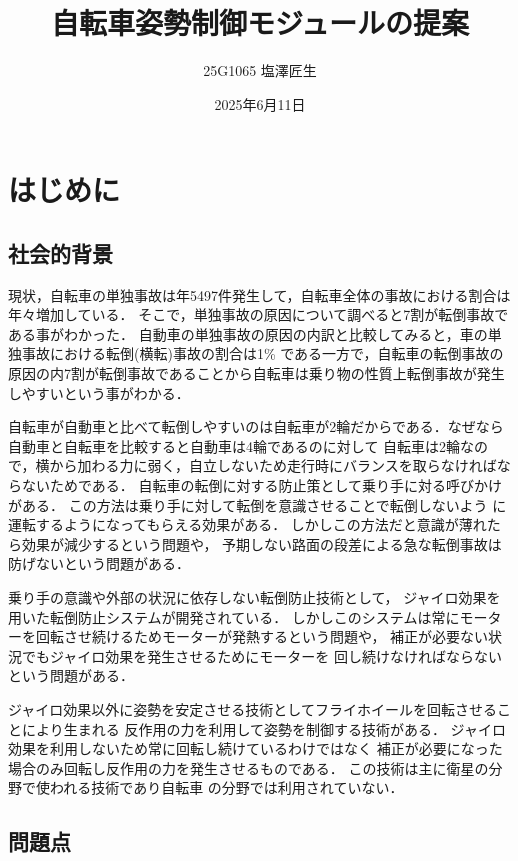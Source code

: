 \documentclass[uplatex,dvipdfmx]{jsarticle}
\begin{document}
\title{自転車姿勢制御モジュールの提案}
\author{25G1065 塩澤匠生}
\date{2025年6月11日}
\maketitle
\section{はじめに}

\subsection{社会的背景}

現状，自転車の単独事故は年5497件発生して，自転車全体の事故における割合は年々増加している\cite{jikokensuu}．
そこで，単独事故の原因について調べると7割が転倒事故である事がわかった\cite{tandokuWariai}．
自動車の単独事故の原因の内訳と比較してみると，車の単独事故における転倒(横転)事故の割合は1\%
である一方で，自転車の転倒事故の原因の内7割が転倒事故であることから自転車は乗り物の性質上転倒事故が発生しやすいという事がわかる．

自転車が自動車と比べて転倒しやすいのは自転車が2輪だからである．なぜなら自動車と自転車を比較すると自動車は4輪であるのに対して
自転車は2輪なので，横から加わる力に弱く，自立しないため走行時にバランスを取らなければな
らないためである．
自転車の転倒に対する防止策として乗り手に対る呼びかけがある．
この方法は乗り手に対して転倒を意識させることで転倒しないよう
に運転するようになってもらえる効果がある．
しかしこの方法だと意識が薄れたら効果が減少するという問題や，
予期しない路面の段差による急な転倒事故は防げないという問題がある．

乗り手の意識や外部の状況に依存しない転倒防止技術として，
ジャイロ効果を用いた転倒防止システムが開発されている\cite{jairo}．
しかしこのシステムは常にモーターを回転させ続けるためモーターが発熱するという問題や，
補正が必要ない状況でもジャイロ効果を発生させるためにモーターを
回し続けなければならないという問題がある．

ジャイロ効果以外に姿勢を安定させる技術としてフライホイールを回転させることにより生まれる
反作用の力を利用して姿勢を制御する技術がある．
ジャイロ効果を利用しないため常に回転し続けているわけではなく
補正が必要になった場合のみ回転し反作用の力を発生させるものである．
この技術は主に衛星の分野で使われる技術であり自転車
の分野では利用されていない．


\subsection{問題点}
\end{document}
